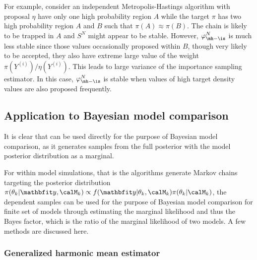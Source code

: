 For example, consider an independent Metropolis-Hastings algorithm with
proposal $\eta$ have only one high probability region $A$ while the target
$\pi$ has two high probability region $A$ and $B$ such that
$\pi(A)\approx\pi(B)$. The chain is likely to be trapped in $A$ and $S^N$
might appear to be stable. However, $\varphi_{\mh-\is}^N$ is much less stable
since those values occasionally proposed within $B$, though very likely to be
accepted, they also have extreme large value of the weight
$\pi(Y^{(i)})/\eta(Y^{(i)})$. This leads to large variance of the importance
sampling estimator. In this case, $\varphi_{\mh-\is}^N$ is stable when values
of high target density values are also proposed frequently.

\subsection{Application to Bayesian model comparison}
\label{sub:MCMC Application to Bayesian model comparison}

It is clear that \rjmcmc can be used directly for the purpose of Bayesian
model comparison, as it generates samples from the full posterior with the
model posterior distribution as a marginal.

For within model simulations, that is the algorithms generate Markov chains
targeting the posterior distribution $\pi(\theta_k|\data,\calM_k) \propto
f(\data|\theta_k,\calM_k)\pi(\theta_k|\calM_k)$, the dependent samples can be
used for the purpose of Bayesian model comparison for finite set of models
through estimating the marginal likelihood and thus the Bayes factor, which is
the ratio of the marginal likelihood of two models. A few methods are
discussed here.

\subsubsection{Generalized harmonic mean estimator}
\label{ssub:Generalized harmonic mean estimator}

